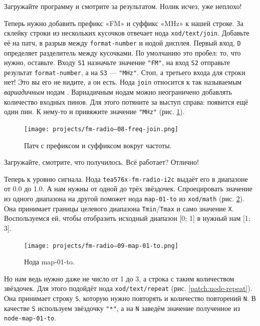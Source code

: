 Загружайте программу и смотрите за результатом. Нолик исчез, уже неплохо!

Теперь нужно добавить префикс «FM» и суффикс «MHz» к нашей строке. За склейку строки из нескольких кусочков отвечает нода \texttt{xod/text/join}. Добавьте её на патч, в разрыв между \texttt{format-number} и нодой дисплея. Первый вход, \texttt{D} определяет разделитель между кусочками. По умолчанию это пробел: то, что нужно, оставьте. Входу \texttt{S1} назначьте значение \texttt{"FM"}, на вход \texttt{S2} отправьте результат \texttt{format-number}, а на \texttt{S3} — \texttt{"MHz"}. Стоп, а третьего входа для строки нет! Это вы его не видите, а он есть. Нода \texttt{join} относится к так называемым \emph{вариадичным} нодам . Вариадичным нодам можно неограничено добавлять количество входных пинов. Для этого потяните за выступ справа: появится ещё один пин. К нему-то и привяжите значение \texttt{"MHz"} (рис. \ref{patch:fm-join}).

\begin{figure}
  \centering
  \texttt{[image: projects/fm-radio--08-freq-join.png]}
  \caption{Патч с префиксом и суффиксом вокруг частоты.}
  \label{patch:fm-join}
\end{figure}

Загружайте, смотрите, что получилось. Всё работает? Отлично!

Теперь к уровню сигнала. Нода \texttt{tea576x-fm-radio-i2c} выдаёт его в диапазоне от 0.0 до 1.0. А нам нужны от одной до трёх звёздочек. Спроецировать значение из одного диапазона на другой поможет нода \texttt{map-01-to} из \texttt{xod/math} (рис. \ref{patch:node-map-01-to}). Она принимает границы целевого диапазона \texttt{Tmin}/\texttt{Tmax} и само значение \texttt{X}. Воспользуемся ей, чтобы отобразить исходный диапазон [0; 1] в нужный нам [1; 3].

\begin{figure}
  \centering
  \texttt{[image: projects/fm-radio--09-map-01-to.png]}
  \caption{Нода map-01-to.}
  \label{patch:node-map-01-to}
\end{figure}

Но нам ведь нужно даже не число от 1 до 3, а строка с таким количеством звёздочек. Для этого подойдёт нода \texttt{xod/text/repeat} (рис. \ref{patch:node-repeat}). Она принимает строку \texttt{S}, которую нужно повторять и количество повторений \texttt{N}. В качестве \texttt{S} используем звёздочку \texttt{"*"}, а на \texttt{N} заведём значение полученное из \texttt{node-map-01-to}.

